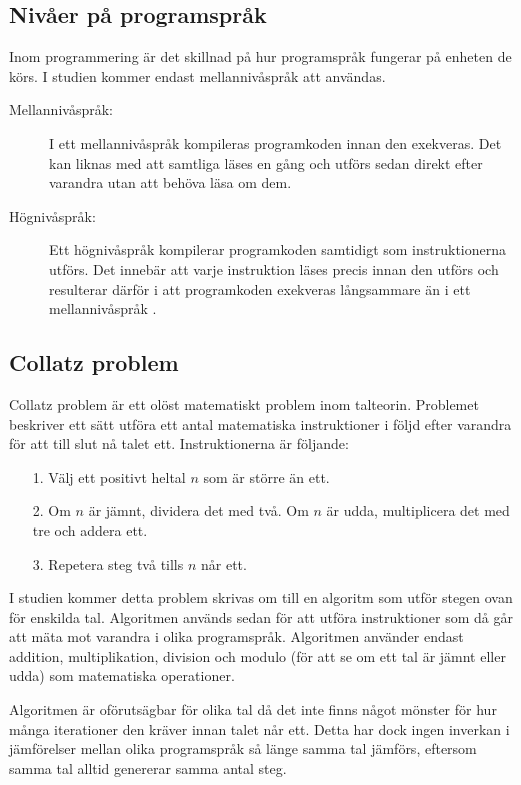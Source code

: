 \documentclass[12pt,swedish]{article}
\begin{document}
\subsection{Nivåer på programspråk}
Inom programmering är det skillnad på hur programspråk fungerar på enheten de körs. I studien kommer endast mellannivåspråk att användas.
\begin{description}
    \item [Mellannivåspråk:] I ett mellannivåspråk kompileras programkoden innan den exekveras. Det kan liknas med att samtliga läses en gång och utförs sedan direkt efter varandra utan att behöva läsa om dem.
    \item [Högnivåspråk:] Ett högnivåspråk kompilerar programkoden samtidigt som instruktionerna utförs. Det innebär att varje instruktion läses precis innan den utförs och resulterar därför i att programkoden exekveras långsammare än i ett mellannivåspråk \citep{maclachlan_1992}.
\end{description}

\subsection{Collatz problem}
Collatz problem är ett olöst matematiskt problem inom talteorin. Problemet beskriver ett sätt utföra ett antal matematiska instruktioner i följd efter varandra för att till slut nå talet ett. Instruktionerna är följande:
\begin{enumerate}
    \item [1.] Välj ett positivt heltal \( n \) som är större än ett.
    \item [2.] Om \( n \) är jämnt, dividera det med två. Om \( n \) är udda, multiplicera det med tre och addera ett.
    \item [3.] Repetera steg två tills \( n \) når ett.
\end{enumerate}
I studien kommer detta problem skrivas om till en algoritm som utför stegen ovan för enskilda tal. Algoritmen används sedan för att utföra instruktioner som då går att mäta mot varandra i olika programspråk. Algoritmen använder endast addition, multiplikation, division och modulo (för att se om ett tal är jämnt eller udda) som matematiska operationer.

Algoritmen är oförutsägbar för olika tal då det inte finns något mönster för hur många iterationer den kräver innan talet når ett. Detta har dock ingen inverkan i jämförelser mellan olika programspråk så länge samma tal jämförs, eftersom samma tal alltid genererar samma antal steg.
\end{document}
